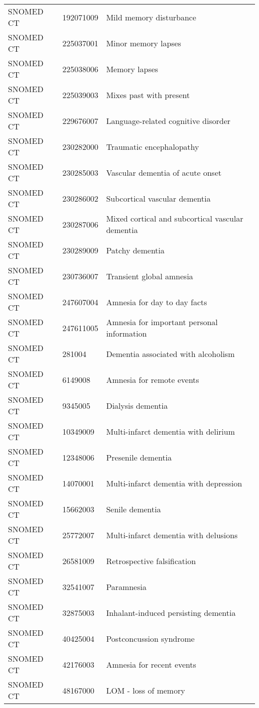 \begin{longtable}{p{}p{}p{}}
  SNOMED CT & 192071009 & Mild memory disturbance \\ 
  SNOMED CT & 225037001 & Minor memory lapses \\ 
  SNOMED CT & 225038006 & Memory lapses \\ 
  SNOMED CT & 225039003 & Mixes past with present \\ 
  SNOMED CT & 229676007 & Language-related cognitive disorder \\ 
  SNOMED CT & 230282000 & Traumatic encephalopathy \\ 
  SNOMED CT & 230285003 & Vascular dementia of acute onset \\ 
  SNOMED CT & 230286002 & Subcortical vascular dementia \\ 
  SNOMED CT & 230287006 & Mixed cortical and subcortical vascular dementia \\ 
  SNOMED CT & 230289009 & Patchy dementia \\ 
  SNOMED CT & 230736007 & Transient global amnesia \\ 
  SNOMED CT & 247607004 & Amnesia for day to day facts \\ 
  SNOMED CT & 247611005 & Amnesia for important personal information \\ 
  SNOMED CT & 281004 & Dementia associated with alcoholism \\ 
  SNOMED CT & 6149008 & Amnesia for remote events \\ 
  SNOMED CT & 9345005 & Dialysis dementia \\ 
  SNOMED CT & 10349009 & Multi-infarct dementia with delirium \\ 
  SNOMED CT & 12348006 & Presenile dementia \\ 
  SNOMED CT & 14070001 & Multi-infarct dementia with depression \\ 
  SNOMED CT & 15662003 & Senile dementia \\ 
  SNOMED CT & 25772007 & Multi-infarct dementia with delusions \\ 
  SNOMED CT & 26581009 & Retrospective falsification \\ 
  SNOMED CT & 32541007 & Paramnesia \\ 
  SNOMED CT & 32875003 & Inhalant-induced persisting dementia \\ 
  SNOMED CT & 40425004 & Postconcussion syndrome \\ 
  SNOMED CT & 42176003 & Amnesia for recent events \\ 
  SNOMED CT & 48167000 & LOM - loss of memory \\ 

\end{longtable}
